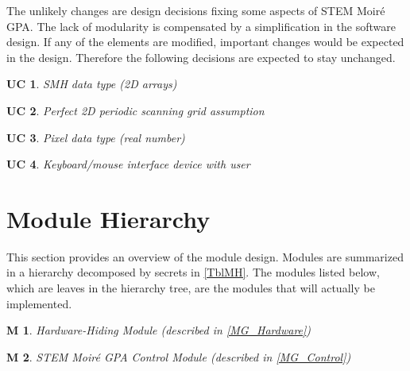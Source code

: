 \documentclass[12pt, titlepage]{article}
\newcommand{\progname}{STEM Moir{\'e} GPA}
\newtheorem{UC}{UC}
\newtheorem{M}{M}
\begin{document}

The unlikely changes are design decisions fixing some aspects of \progname{}. 
The lack of modularity is compensated by a simplification in the software 
design. If any of the elements are modified, important changes would be expected 
in the design. Therefore the following decisions are expected to stay unchanged.

\begin{UC}\normalfont SMH data type (2D arrays)
\label{UC_Input_data}
\end{UC}

\begin{UC}\normalfont Perfect 2D periodic scanning grid assumption
\label{UC_Assum_2DPeriodicGrid}
\end{UC}

\begin{UC}\normalfont Pixel data type (real number)
\label{UC_Assum_Pixel}
\end{UC}

\begin{UC}\normalfont Keyboard/mouse interface device with user
\label{UC_Assum_Hardware}
\end{UC}

\section{Module Hierarchy} \label{SecMH}

This section provides an overview of the module design. Modules are summarized
in a hierarchy decomposed by secrets in \cref{TblMH}. The modules listed
below, which are leaves in the hierarchy tree, are the modules that will
actually be implemented.

\begin{M}\normalfont Hardware-Hiding Module (described in \cref{MG_Hardware})
\label{M_Hardware}
\end{M}

\begin{M}\normalfont \progname{}  Control Module (described in \cref{MG_Control})
\label{M_Control}
\end{M}
\end{document}
